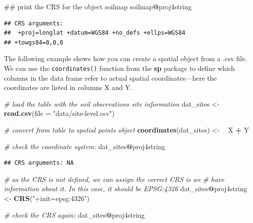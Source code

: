 \documentclass[10pt,b5paper,]{book}
\newenvironment{Shaded}{\begin{snugshade}}{\end{snugshade}}
\newcommand{\CommentTok}[1]{\textcolor[rgb]{0.56,0.35,0.01}{\textit{#1}}}
\newcommand{\DataTypeTok}[1]{\textcolor[rgb]{0.13,0.29,0.53}{#1}}
\newcommand{\ErrorTok}[1]{\textcolor[rgb]{0.64,0.00,0.00}{\textbf{#1}}}
\newcommand{\KeywordTok}[1]{\textcolor[rgb]{0.13,0.29,0.53}{\textbf{#1}}}
\newcommand{\NormalTok}[1]{#1}
\newcommand{\OperatorTok}[1]{\textcolor[rgb]{0.81,0.36,0.00}{\textbf{#1}}}
\newcommand{\StringTok}[1]{\textcolor[rgb]{0.31,0.60,0.02}{#1}}
\theoremstyle{definition}
\theoremstyle{definition}
\theoremstyle{definition}
\theoremstyle{remark}
\begin{document}
\begin{Shaded}
\begin{Highlighting}[]
\NormalTok{## print the CRS for the object soilmap}
\NormalTok{soilmap}\OperatorTok{@}\NormalTok{proj4string}
\end{Highlighting}
\end{Shaded}

\begin{verbatim}
## CRS arguments:
##  +proj=longlat +datum=WGS84 +no_defs +ellps=WGS84
## +towgs84=0,0,0
\end{verbatim}

The following example shows how you can create a spatial object from a
.csv file. We can use the \texttt{coordinates()} function from the
\textbf{sp} package to define which columns in the data frame refer to
actual spatial coordinates---here the coordinates are listed in columns
X and Y.

\begin{Shaded}
\begin{Highlighting}[]
\CommentTok{# load the table with the soil observations site information}
\NormalTok{dat_sites <-}\StringTok{ }\KeywordTok{read.csv}\NormalTok{(}\DataTypeTok{file =} \StringTok{"data/site-level.csv"}\NormalTok{)}

\CommentTok{# convert from table to spatial points object}
\KeywordTok{coordinates}\NormalTok{(dat_sites) <-}\StringTok{ }\ErrorTok{~}\StringTok{ }\NormalTok{X }\OperatorTok{+}\StringTok{ }\NormalTok{Y}

\CommentTok{# check the coordinate system:}
\NormalTok{dat_sites}\OperatorTok{@}\NormalTok{proj4string}
\end{Highlighting}
\end{Shaded}

\begin{verbatim}
## CRS arguments: NA
\end{verbatim}

\begin{Shaded}
\begin{Highlighting}[]
\CommentTok{# as the CRS is not defined, we can assign the correct CRS is we}
\CommentTok{# have information about it. In this case, it should be EPSG:4326}
\NormalTok{dat_sites}\OperatorTok{@}\NormalTok{proj4string <-}\StringTok{ }\KeywordTok{CRS}\NormalTok{(}\StringTok{"+init=epsg:4326"}\NormalTok{)}

\CommentTok{# check the CRS again:}
\NormalTok{dat_sites}\OperatorTok{@}\NormalTok{proj4string}
\end{Highlighting}
\end{Shaded}
\end{document}

